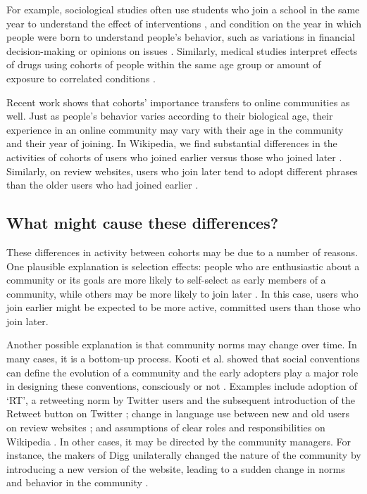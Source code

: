 \documentclass[10pt, oneside, onecolumn]{article}
\begin{document}
For example, sociological studies often use students who join a school in the same year to understand the effect of interventions \cite{Goyette2008,Alexander2012}, and condition on the year in which people were born to understand people's  behavior, such as variations in financial decision-making \cite{Attanasio1993} or opinions on issues \cite{Firebaugh1988,Jennings1996}. Similarly, medical studies interpret effects of drugs using cohorts of people within the same age group or amount of exposure to correlated conditions \cite{Howartz1996,Davis2010}.  

Recent work shows that cohorts' importance transfers to online communities as well. Just as people's behavior varies according to their biological age, their experience in an online community may vary with their age in the community and their year of joining. In Wikipedia, we find substantial differences in the activities of cohorts of users who joined earlier versus those who joined later \cite{Welser2011}. Similarly, on review websites, users who join later tend to adopt different phrases than the older users who had joined earlier \cite{Danescu-niculescu-mizil2013}.

\subsection{What might cause these differences?}

These differences in activity between cohorts may be due to a number of reasons.  One plausible explanation is selection effects: people who are enthusiastic about a community or its goals are more likely to self-select as early members of a community, while others may be more likely to join later \cite{Li2008}.  In this case, users who join earlier might be expected to be more active, committed users than those who join later. 

Another possible explanation is that community norms may change over time.  In many cases, it is a bottom-up process. Kooti et al. showed that social conventions can define the evolution of a community and the early adopters play a major role in designing these conventions, consciously or not \cite{Kooti2010}. Examples include adoption of `RT', a retweeting norm by Twitter users and the subsequent introduction of the Retweet button on Twitter \cite{Kooti2010}; change in language use between new and old users on review websites \cite{Danescu-niculescu-mizil2013}; and assumptions of clear roles and responsibilities on Wikipedia \cite{Kittur2007a}. In other cases, it may be directed by the community managers. For instance, the makers of Digg unilaterally changed the nature of the community by introducing a new version of the website, leading to a sudden change in norms and behavior in the community \cite{Ingram2014,Lardinois2014}. 
\end{document}
